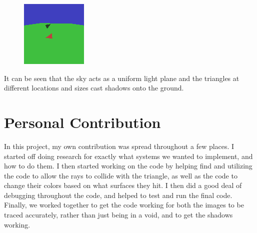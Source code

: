 \documentclass{article}
\begin{document}
\begin{multicols}{2}
\begin{figure}
\centering
\includegraphics[width=\linewidth]{./imgs/output4}
\caption{}
\label{fig:output4}
\end{figure}

\end{multicols}

It can be seen that the sky acts as a uniform light plane and the triangles at different locations and sizes cast shadows
onto the ground.

\section{Personal Contribution}
In this project, my own contribution was spread throughout a few places. I started off doing research for exactly what systems we
wanted to implement, and how to do them. I then started working on the code by helping find and utilizing the code to allow the
rays to collide with the triangle, as well as the code to change their colors based on what surfaces they hit. I then did a good
deal of debugging throughout the code, and helped to test and run the final code. Finally, we worked together to get the code
working for both the images to be traced accurately, rather than just being in a void, and to get the shadows working.
\end{document}
